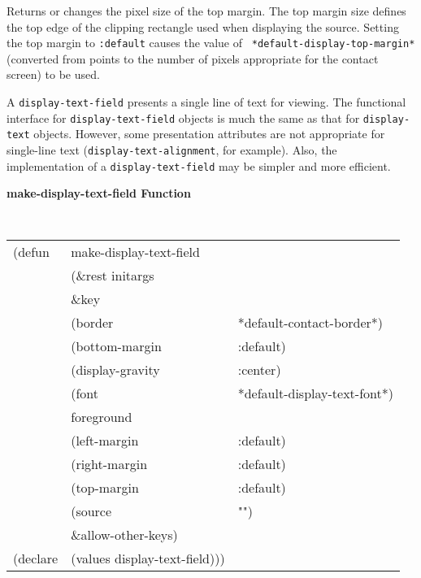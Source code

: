 \begin{flushright} \parbox[t]{6.125in}{
Returns or changes the pixel size of the
top margin.  The top margin size defines
the top edge of the clipping rectangle used when displaying the source.
Setting the top margin to {\tt :default} causes the value of {\tt
*default-display-top-margin*} (converted from points to the number of pixels
appropriate for the contact screen) to be used.
}
\end{flushright}

\vfill
\pagebreak



A {\tt display-text-field} presents a single line of text for viewing.  The
functional interface for {\tt display-text-field} objects is much the same as
that for {\tt display-text} objects.  However, some presentation attributes are
not appropriate for single-line text ({\tt display-text-alignment}, for
example).  Also, the implementation of a {\tt display-text-field} may be simpler
and more efficient.



{\samepage
{\large {\bf make-display-text-field \hfill Function}} 
\begin{flushright} \parbox[t]{6.125in}{
\tt
\begin{tabular}{lll}
\raggedright
(defun & make-display-text-field \\
       & (\&rest initargs \\
       & \&key  \\
       &   (border              & *default-contact-border*) \\ 
       &   (bottom-margin       & :default) \\ 
       &   (display-gravity             & :center) \\
       &   (font                & *default-display-text-font*) \\ 
       &   foreground \\
       &   (left-margin         & :default) \\ 
       &   (right-margin        & :default) \\ 
       &   (top-margin          & :default) \\
       &   (source              & "")\\ 
       &   \&allow-other-keys) \\
(declare & (values   display-text-field)))
\end{tabular}
\rm

}\end{flushright}}

